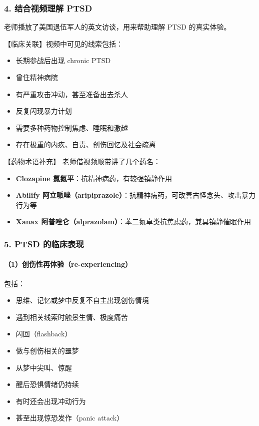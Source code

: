 \documentclass[
  chinese,
  9pt,
  a4paper,
]{ctexart}
\providecommand{\tightlist}{%
  \setlength{\itemsep}{0pt}\setlength{\parskip}{0pt}}
\begin{document}
\subsubsection{4. 结合视频理解
PTSD}\label{ux7ed3ux5408ux89c6ux9891ux7406ux89e3-ptsd}

老师播放了美国退伍军人的英文访谈，用来帮助理解 PTSD 的真实体验。

【临床关联】视频中可见的线索包括：

\begin{itemize}
\tightlist
\item
  长期参战后出现 chronic PTSD
\item
  曾住精神病院
\item
  有严重攻击冲动，甚至准备出去杀人
\item
  反复闪现暴力计划
\item
  需要多种药物控制焦虑、睡眠和激越
\item
  存在极重的内疚、自责、创伤回忆及社会疏离
\end{itemize}

【药物术语补充】 老师借视频顺带讲了几个药名：

\begin{itemize}
\tightlist
\item
  \textbf{Clozapine 氯氮平}：抗精神病药，有较强镇静作用
\item
  \textbf{Abilify
  阿立哌唑（aripiprazole）}：抗精神病药，可改善古怪念头、攻击暴力行为等
\item
  \textbf{Xanax
  阿普唑仑（alprazolam）}：苯二氮卓类抗焦虑药，兼具镇静催眠作用
\end{itemize}

\subsubsection{5. PTSD
的临床表现}\label{ptsd-ux7684ux4e34ux5e8aux8868ux73b0}

\paragraph{（1）创伤性再体验（re-experiencing）}\label{ux521bux4f24ux6027ux518dux4f53ux9a8cre-experiencing}

包括：

\begin{itemize}
\tightlist
\item
  思维、记忆或梦中反复不自主出现创伤情境
\item
  遇到相关线索时触景生情、极度痛苦
\item
  闪回（flashback）
\item
  做与创伤相关的噩梦
\item
  从梦中尖叫、惊醒
\item
  醒后恐惧情绪仍持续
\item
  有时还会出现冲动行为
\item
  甚至出现惊恐发作（panic attack）
\end{itemize}
\end{document}
